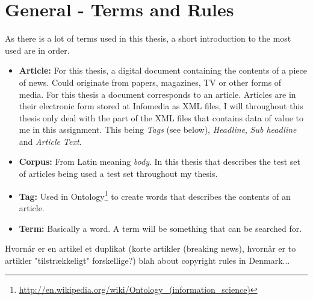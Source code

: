 \chapter{General - Terms and Rules}
As there is a lot of terms used in this thesis, a short introduction to the most used are in order.
\begin{itemize}
\item \textbf{Article:} For this thesis, a digital document containing the contents of a piece of news. Could originate from papers, magazines, TV or other forms of media. For this thesis a document corresponds to an article. Articles are in their electronic form stored at Infomedia as XML files, I will throughout this thesis only deal with the part of the XML files that contains data of value to me in this assignment. This being \textit{Tags} (see below), \textit{Headline}, \textit{Sub headline} and \textit{Article Text}.
\item \textbf{Corpus:} From Latin meaning \textit{body}. In this thesis that describes the test set of articles being used a test set throughout my thesis.
\item \textbf{Tag:} Used in Ontology\footnote{\url{http://en.wikipedia.org/wiki/Ontology_(information_science)}} to create words that describes the contents of an article.
\item \textbf{Term:} Basically a word. A term will be something that can be searched for.
\end{itemize}

Hvornår er en artikel et duplikat (korte artikler (breaking news), hvornår er to artikler "tilstrækkeligt" forskellige?)
blah about copyright rules in Denmark...